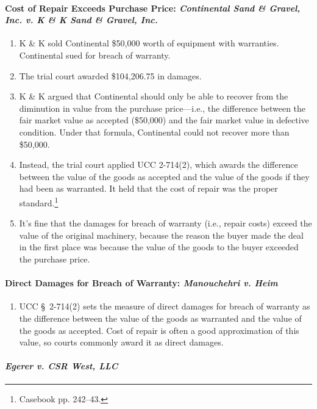 \paragraph{Cost of Repair Exceeds Purchase Price: \emph{Continental Sand \& 
Gravel, Inc. v. K \& K Sand \& Gravel, Inc.}}
\begin{enumerate}
    \item K \& K sold Continental \$50,000 worth of equipment with warranties. 
    Continental sued for breach of warranty.
    \item The trial court awarded \$104,206.75 in damages.
    \item K \& K argued that Continental should only be able to recover from 
    the diminution in value from the purchase price---i.e., the difference 
    between the fair market value as accepted (\$50,000) and the fair market 
    value in defective condition. Under that formula, Continental could not 
    recover more than \$50,000.
    \item Instead, the trial court applied UCC 2-714(2), which awards the 
    difference between the value of the goods as accepted and the value of the 
    goods if they had been as warranted. It held that the cost of repair was 
    the proper standard.\footnote{Casebook pp. 242--43.}
    \item It's fine that the damages for breach of warranty (i.e., repair 
    costs) exceed the value of the original machinery, because the reason the 
    buyer made the deal in the first place was because the value of the goods 
    to the buyer exceeded the purchase price.
\end{enumerate}

\paragraph{Direct Damages for Breach of Warranty: \emph{Manouchehri v. Heim}}

\begin{enumerate}
    \item UCC \S\ 2-714(2) sets the measure of direct damages for breach of 
    warranty as the difference between the value of the goods as warranted and 
    the value of the goods as accepted. Cost of repair is often a good 
    approximation of this value, so courts commonly award it as direct 
    damages.
\end{enumerate}

\paragraph{\emph{Egerer v. CSR West, LLC}}

